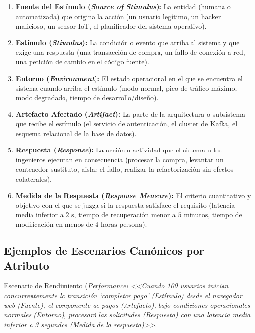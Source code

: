 \begin{enumerate}[leftmargin=1.5em]
  \item \textbf{Fuente del Estímulo (\emph{Source of Stimulus}):} La entidad (humana o automatizada) que origina la acción (un usuario legítimo, un hacker malicioso, un sensor IoT, el planificador del sistema operativo).
  \item \textbf{Estímulo (\emph{Stimulus}):} La condición o evento que arriba al sistema y que exige una respuesta (una transacción de compra, un fallo de conexión a red, una petición de cambio en el código fuente).
  \item \textbf{Entorno (\emph{Environment}):} El estado operacional en el que se encuentra el sistema cuando arriba el estímulo (modo normal, pico de tráfico máximo, modo degradado, tiempo de desarrollo/diseño).
  \item \textbf{Artefacto Afectado (\emph{Artifact}):} La parte de la arquitectura o subsistema que recibe el estímulo (el servicio de autenticación, el cluster de Kafka, el esquema relacional de la base de datos).
  \item \textbf{Respuesta (\emph{Response}):} La acción o actividad que el sistema o los ingenieros ejecutan en consecuencia (procesar la compra, levantar un contenedor sustituto, aislar el fallo, realizar la refactorización sin efectos colaterales).
  \item \textbf{Medida de la Respuesta (\emph{Response Measure}):} El criterio cuantitativo y objetivo con el que se juzga si la respuesta satisface el requisito (latencia media inferior a $2\text{ s}$, tiempo de recuperación menor a $5\text{ minutos}$, tiempo de modificación en menos de $4\text{ horas-persona}$).
\end{enumerate}

\subsection{Ejemplos de Escenarios Canónicos por Atributo}

\begin{ejemplo}{Escenario de Rendimiento (\emph{Performance})}
\emph{<<Cuando 100 usuarios inician concurrentemente la transición `completar pago' (Estímulo) desde el navegador web (Fuente), el componente de pagos (Artefacto), bajo condiciones operacionales normales (Entorno), procesará las solicitudes (Respuesta) con una latencia media inferior a 3 segundos (Medida de la respuesta)>>}.
\end{ejemplo}

